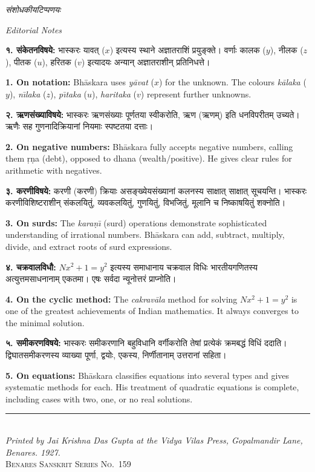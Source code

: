 \documentclass[11pt,a4paper]{article}
\newcommand{\dev}[1]{{\devanagarifont #1}}
\newcommand{\longline}{\noindent\rule{\textwidth}{0.4pt}}
\newcommand{\bicol}[2]{%
\noindent%
\begin{minipage}[t]{0.48\textwidth}
\begin{flushleft}
\small
#1
\end{flushleft}
\end{minipage}%
\hfill%
\begin{minipage}[t]{0.48\textwidth}
\begin{flushleft}
\small
#2
\end{flushleft}
\end{minipage}%
\vspace{0.4em}
}
\newcommand{\subsectionbicol}[2]{%
\vspace{0.4em}
\noindent%
\begin{minipage}[t]{0.48\textwidth}
\begin{center}
\normalsize\itshape\color{sectioncolor}
\dev{#1}
\end{center}
\end{minipage}%
\hfill%
\begin{minipage}[t]{0.48\textwidth}
\begin{center}
\normalsize\itshape\color{sectioncolor}
#2
\end{center}
\end{minipage}%
\vspace{0.2em}
}
\begin{document}
\subsectionbicol{संशोधकीयटिप्पणयः}{Editorial Notes}

\vspace{0.5cm}

\bicol{%
\textbf{१. संकेतनविषये:} भास्करः \dev{यावत्} ($x$) इत्यस्य स्थाने अज्ञातराशिं प्रयुङ्क्ते। वर्णाः \dev{कालक} ($y$), \dev{नीलक} ($z$), \dev{पीतक} ($u$), \dev{हरितक} ($v$) इत्यादयः अन्यान् अज्ञातराशीन् प्रतिनिधत्ते।
}{%
\textbf{1. On notation:} Bh\={a}skara uses \textit{y\={a}vat} ($x$) for the unknown. The colours \textit{k\={a}laka} ($y$), \textit{n\={\i}laka} ($z$), \textit{p\={\i}taka} ($u$), \textit{haritaka} ($v$) represent further unknowns.
}

\vspace{0.5cm}

\bicol{%
\textbf{२. ऋणसंख्याविषये:} भास्करः ऋणसंख्याः पूर्णतया स्वीकरोति, \dev{ऋण} (ऋणम्) इति धनविपरीतम् उच्यते। ऋणैः सह गुणनादिक्रियानां नियमाः स्पष्टतया दत्ताः।
}{%
\textbf{2. On negative numbers:} Bh\={a}skara fully accepts negative numbers, calling them \d{r}\d{n}a (debt), opposed to dhana (wealth/positive). He gives clear rules for arithmetic with negatives.
}

\vspace{0.5cm}

\bicol{%
\textbf{३. करणीविषये:} \dev{करणी} (करणी) क्रियाः असङ्ख्येयसंख्यानां कलनस्य साक्षात् साक्षात् सूचयन्ति। भास्करः करणीविशिष्टराशीन् संकलयितुं, व्यवकलयितुं, गुणयितुं, विभजितुं, मूलानि च निष्काषयितुं शक्नोति।
}{%
\textbf{3. On surds:} The \textit{kara\d{n}\={\i}} (surd) operations demonstrate sophisticated understanding of irrational numbers. Bh\={a}skara can add, subtract, multiply, divide, and extract roots of surd expressions.
}

\vspace{0.5cm}

\bicol{%
\textbf{४. चक्रवालविधौ:} $Nx^2 + 1 = y^2$ इत्यस्य समाधानाय \dev{चक्रवाल} विधिः भारतीयगणितस्य अत्युत्तमसाधनानाम् एकतमा। एषः सर्वदा न्यूनोत्तरं प्राप्नोति।
}{%
\textbf{4. On the cyclic method:} The \textit{cakrav\={a}la} method for solving $Nx^2 + 1 = y^2$ is one of the greatest achievements of Indian mathematics. It always converges to the minimal solution.
}

\vspace{0.5cm}

\bicol{%
\textbf{५. समीकरणविषये:} भास्करः समीकरणानि बहुविधानि वर्गीकरोति तेषां प्रत्येकं क्रमबद्धं विधिं ददाति। द्विघातसमीकरणस्य व्याख्या पूर्णा, द्वयोः, एकस्य, निर्णीतानाम् उत्तरानां सहिता।
}{%
\textbf{5. On equations:} Bh\={a}skara classifies equations into several types and gives systematic methods for each. His treatment of quadratic equations is complete, including cases with two, one, or no real solutions.
}

\vspace{1cm}

\begin{center}
\longline\\[0.3cm]
{\small\textit{Printed by Jai Krishna Das Gupta at the Vidya Vilas Press, Gopalmandir Lane, Benares. 1927.}}\\[0.1cm]
{\small\textsc{Benares Sanskrit Series No.~159}}
\end{center}
\end{document}
